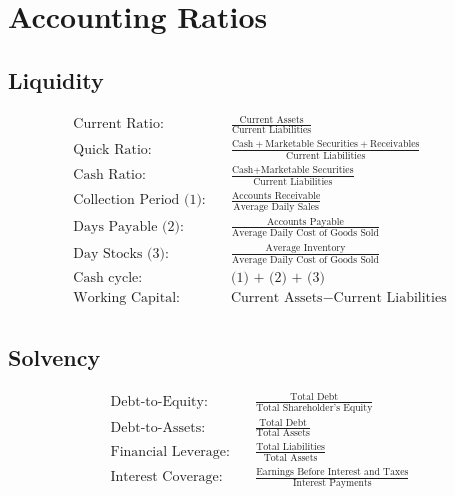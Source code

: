 \documentclass[12pt]{article}
\begin{document}
\section{Accounting Ratios}
	\subsection{Liquidity}
	\begin{tcolorbox}
	\begin{align*}
		\text{Current Ratio:} \quad & \frac{\text{Current Assets}}{\text{Current Liabilities}} \\
		\text{Quick Ratio:} \quad & \frac{\text{Cash} + \text{Marketable Securities} + \text{Receivables}}{\text{Current Liabilities}} \\
		\text{Cash Ratio:} \quad & \frac{\text{Cash} + \text{Marketable Securities}}{\text{Current Liabilities}}  \\
		\text{Collection Period (1):} \quad & \frac{\text{Accounts Receivable}}{\text{Average Daily Sales}} \\
		\text{Days Payable (2):} \quad & \frac{\text{Accounts Payable}}{\text{Average Daily Cost of Goods Sold}} \\
		\text{Day Stocks (3):} \quad & \frac{\text{Average Inventory}}{\text{Average Daily Cost of Goods Sold}} \\
		\text{Cash cycle:} \quad & \text{(1) + (2) + (3) } \\
		\text{Working Capital:} \quad & \text{Current Assets} - \text{Current Liabilities} \\
	\end{align*}
	\end{tcolorbox}
	\subsection{Solvency}
	\begin{tcolorbox}
	\begin{align*}
		\text{Debt-to-Equity:} \quad & \frac{\text{Total Debt}}{\text{Total Shareholder's Equity}} \\
		\text{Debt-to-Assets:} \quad & \frac{\text{Total Debt}}{\text{Total Assets}} \\
		\text{Financial Leverage:} \quad & \frac{\text{Total Liabilities}}{\text{Total Assets}} \\
		\text{Interest Coverage:} \quad & \frac{\text{Earnings Before Interest and Taxes}}{\text{Interest Payments}}
	\end{align*}
	\end{tcolorbox}
\end{document}
